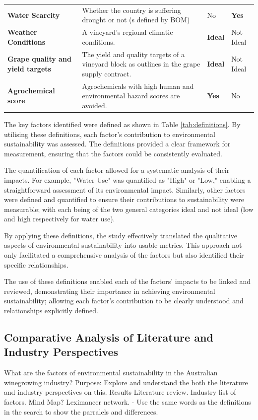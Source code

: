 \begin{table}[h]
\begin{tabular}{@{}llll@{}}
    \textbf{Water Scarcity} & Whether the country is suffering drought or not (s defined by BOM) & No & \textbf{Yes} \\
    \textbf{Weather Conditions} & A vineyard’s regional climatic conditions. & \textbf{Ideal} & Not Ideal \\
    \textbf{Grape quality and yield targets} & The yield and quality targets of a vineyard block as outlines in the grape supply contract. & \textbf{Ideal} & Not Ideal \\
    \textbf{Agrochemical score} & Agrochemicals with high human and environmental hazard scores are avoided. & \textbf{Yes} & No \\ \bottomrule
    \end{tabular}
\end{table}

The key factors identified were defined as shown in Table \ref{tab:definitions}. By utilising these definitions, each factor's contribution to environmental sustainability was assessed. The definitions provided a clear framework for measurement, ensuring that the factors could be consistently evaluated.

The quantification of each factor allowed for a systematic analysis of their impacts. For example, "Water Use" was quantified as "High" or "Low," enabling a straightforward assessment of its environmental impact. Similarly, other factors were defined and quantified to ensure their contributions to sustainability were measurable; with each being of the two general categories ideal and not ideal (low and high respectively for water use).

By applying these definitions, the study effectively translated the qualitative aspects of environmental sustainability into usable metrics. This approach not only facilitated a comprehensive analysis of the factors but also identified their specific relationships.

The use of these definitions enabled each of the factors' impacts to be linked and reviewed, demonstrating their importance in achieving environmental sustainability; allowing each factor's contribution to be clearly understood and relationships  explicitly defined.

\subsection{Comparative Analysis of Literature and Industry Perspectives}
    What are the factors of environmental sustainability in the Australian winegrowing industry?
        Purpose: Explore and understand the both the literature and industry perspectives on this.
        Results Literature review. Industry list of factors. Mind Map? Leximancer network.
        - Use the same words as the definitions in the search to show the parralels and differences.

